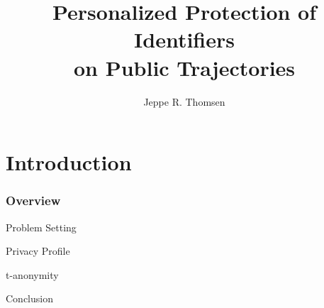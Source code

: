 \documentclass[t,mathserif]{beamer}
\title[DAT8\hspace{21em}\insertframenumber/\inserttotalframenumber]{Personalized Protection of Identifiers\\on Public Trajectories}
\author[Jeppe R. Thomsen]{Jeppe R. Thomsen}%
\institute{Aalborg University\\ Department of Computer Science}
\begin{document}
\begin{frame} %
\titlepage
\end{frame}

%
%
%
\section{Introduction} %

\begin{frame}[red]
\frametitle{Overview}
\Large
Problem Setting

\vspace{1em}

Privacy Profile
\vspace{1em}

t-anonymity
\vspace{1em}

Conclusion

\end{frame}


%
%

%
%

%
%
%
%

\end{document}
